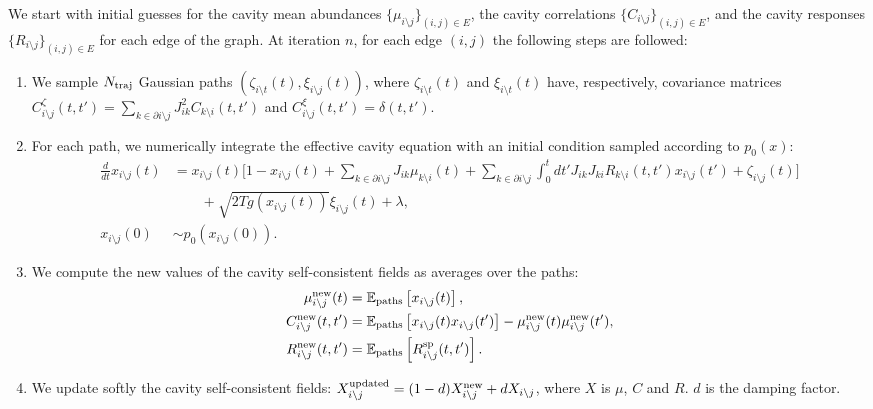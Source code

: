 \documentclass[
    preprint,
    linenumbers,
    amsmath,amssymb,amsfonts,
    aps, physrev,
    superscriptaddress,
    10pt,
    bibnotes
    ]{revtex4-2}
\begin{document}
We start with initial guesses for the cavity mean abundances $\{\mu_{i\setminus j}\}_{(i,j)\in E}$, the cavity correlations $\{C_{i\setminus j}\}_{(i,j)\in E}$, and the cavity responses $\{R_{i\setminus j}\}_{(i,j)\in E}$ for each edge of the graph. At iteration $n$, for each edge $(i,j)$ the following steps are followed:
\begin{enumerate}
    \item We sample $N_{\rm traj}$ Gaussian paths $(\zeta_{i\setminus t}(t), \xi_{i\setminus j}(t))$, where $\zeta_{i\setminus t}(t)$ and $\xi_{i\setminus t}(t)$ have, respectively, covariance matrices $C^{\zeta}_{i\setminus j}(t,t')=\sum_{k\in\partial i \setminus j}J_{ik}^2C_{k\setminus i}(t,t')$ and $C^{\xi}_{i\setminus j}(t,t')=\delta(t,t')$.
    \item For each path, we numerically integrate the effective cavity equation with an initial condition sampled according to $p_0(x)$:
    \begin{align*}
          \frac{d}{dt}x_{i\setminus j}(t) & =x_{i\setminus j}(t)\Biggl[1-x_{i\setminus j}(t)+\sum_{k\in\partial i\setminus j}J_{ik}\mu_{k\setminus i}(t) + \sum_{k\in\partial i\setminus j}\int_{0}^{t}dt'J_{ik}J_{ki}R_{k\setminus i}(t,t')x_{i\setminus j}(t')+\zeta_{i\setminus j}(t)\Biggr]\\
          &\qquad+\sqrt{2Tg(x_{i\setminus j}(t))}\xi_{i\setminus j}(t)+\lambda,\\
          x_{i\setminus j}(0) & \sim p_0(x_{i\setminus j}(0)).
    \end{align*}
    \item We compute the new values of the cavity self-consistent fields as averages over the paths:
    \begin{align*}
        \mu^{\rm new}_{i\setminus j}(t) & = \mathbb{E}_{\rm paths}\left[x_{i\setminus j}(t) \right],\\
        C^{\rm new}_{i\setminus j}(t,t') & = \mathbb{E}_{\rm paths}\left[x_{i\setminus j}(t)x_{i\setminus j}(t') \right] - \mu^{\rm new}_{i\setminus j}(t)\mu^{\rm new}_{i\setminus j}(t'),\\
        R^{\rm new}_{i\setminus j}(t,t') & = \mathbb{E}_{\rm paths}\left[R^{\rm sp}_{i\setminus j}(t,t') \right].
    \end{align*}
    \item We update softly the cavity self-consistent fields: $X_{i\setminus j}^{\rm updated}=(1-d)X_{i\setminus j}^{\rm new}+dX_{i\setminus j}$, where $X$ is $\mu$, $C$ and $R$. $d$ is the damping factor.
\end{enumerate}
\end{document}
